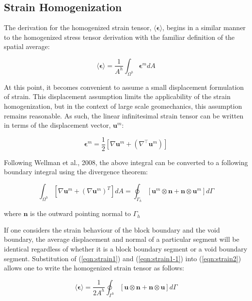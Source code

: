 \subsection{Strain Homogenization}

The derivation for the homogenized strain tensor, $\langle\boldsymbol{\epsilon}\rangle$, begins in a similar manner to the homogenized stress tensor derivation with the familiar definition of the spatial average:

\begin{equation}
\langle\boldsymbol{\epsilon}\rangle=\frac{1}{A^{h}}\int_{\Omega^{h}}\boldsymbol{\epsilon}^m dA\label{eqn:strain2}
\end{equation}

At this point, it becomes convenient to assume a small displacement formulation of strain. This displacement assumption limits the applicability of the strain homogenization, but in the context of large scale geomechanics, this assumption remains reasonable. As such, the linear infinitesimal strain tensor can be written in terms of the displacement vector, $\mathbf{u}^m$:

\begin{equation}
\boldsymbol{\epsilon}^m=\frac{1}{2}\left[\nabla\mathbf{u}^m+\left(\nabla^\top \mathbf{u}^m\right)\right]\label{eqn:strain1}
\end{equation}

Following Wellman et al., 2008, the above integral can be converted to a following boundary integral using the divergence theorem:

\begin{equation}
\int_{\Omega^h}\left[\nabla\mathbf{u}^m+\left(\nabla\mathbf{u}^m\right)^{T}\right]dA=\oint_{\Gamma_h}\left[\mathbf{u}^m\otimes\mathbf{n}+\mathbf{n}\otimes\mathbf{u}^m\right]d\Gamma\label{eqn:strain1-1}
\end{equation}

\noident where $\mathbf{n}$ is the outward pointing normal to $\Gamma_h$

If one considers the strain behaviour of the block boundary and the void boundary, the average displacement and normal of a particular segment
will be identical regardless of whether it is a block boundary segment or a void boundary segment. Substitution of (\ref{eqn:strain1}) and (\ref{eqn:strain1-1}) into (\ref{eqn:strain2}) allows one to write the homogenized strain tensor as follows:

\begin{equation}
\langle\boldsymbol{\epsilon}\rangle=\frac{1}{2A^{h}}\oint_{\Gamma^{h}}\left[\mathbf{u}\otimes\mathbf{n}+\mathbf{n}\otimes\mathbf{u}\right]d\Gamma\label{eqn:strain5-1}
\end{equation}


